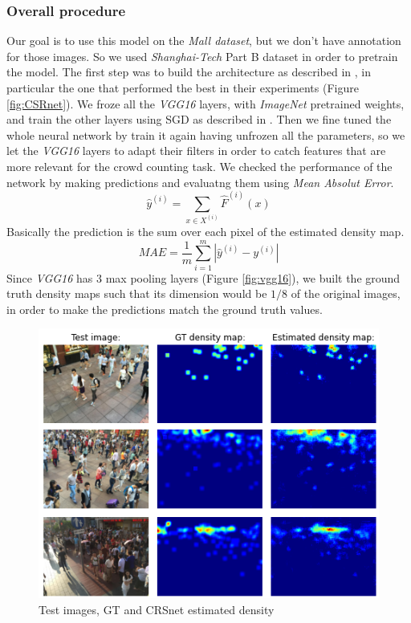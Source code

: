 \documentclass[10pt,twocolumn,letterpaper]{article}
\begin{document}
\subsubsection{Overall procedure}
Our goal is to use this model on the \textit{Mall dataset}, but we don't have annotation for those images. So we used \textit{Shanghai-Tech} Part B dataset in order to pretrain the model. The first step was to build the architecture as described in \cite{li2018csrnet}, in particular the one that performed the best in their experiments (Figure \ref{fig:CSRnet}). We froze all the \textit{VGG16} layers, with \textit{ImageNet} pretrained weights, and train the other layers using SGD as described in \cite{li2018csrnet}. Then we fine tuned the whole neural network by train it again having unfrozen all the parameters, so we let the \textit{VGG16} layers to adapt their filters in order to catch features that are more relevant for the crowd counting task. We checked the performance of the network by making predictions and evaluatng them using \textit{Mean Absolut Error}.
\begin{equation}
	\hat{y}^{(i)} = \sum_{x \in X^{(i)}}\hat{F}^{(i)}(x)
\end{equation}
Basically the prediction is the sum over each pixel of the estimated density map.
\begin{equation}
	MAE = \frac{1}{m}  \sum_{i = 1}^{m} |\hat{y}^{(i)} - y^{(i)}|
\end{equation}
Since \textit{VGG16} has 3 max pooling layers (Figure \ref{fig:vgg16}), we built the ground truth density maps such that its dimension would be $1/8$ of the original images, in order to make the predictions match the ground truth values.


\begin{figure}[h!]
	\includegraphics[width=\linewidth]{pics/DMpred.png}
	\caption{Test images, GT and CRSnet estimated density}
	\label{fig:DMpred}
\end{figure}
\end{document}
